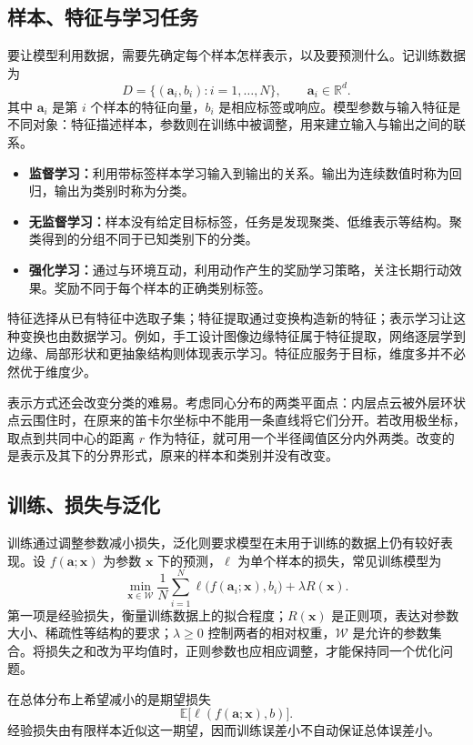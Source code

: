 \documentclass[UTF8,fontset=fandol,a4paper,12pt]{ctexart}
\newcommand{\R}{\mathbb R}
\newcommand{\E}{\mathbb E}
\newcommand{\vx}{\boldsymbol x}
\newcommand{\va}{\boldsymbol a}
\theoremstyle{definition}
\begin{document}
\subsection{样本、特征与学习任务}
要让模型利用数据，需要先确定每个样本怎样表示，以及要预测什么。记训练数据为
\[
 D=\{(\va_i,b_i):i=1,\ldots,N\},\qquad \va_i\in\R^d.
\]
其中 $\va_i$ 是第 $i$ 个样本的特征向量，$b_i$ 是相应标签或响应。模型参数与输入特征是不同对象：特征描述样本，参数则在训练中被调整，用来建立输入与输出之间的联系。
\begin{itemize}
\item \textbf{监督学习：}利用带标签样本学习输入到输出的关系。输出为连续数值时称为回归，输出为类别时称为分类。
\item \textbf{无监督学习：}样本没有给定目标标签，任务是发现聚类、低维表示等结构。聚类得到的分组不同于已知类别下的分类。
\item \textbf{强化学习：}通过与环境互动，利用动作产生的奖励学习策略，关注长期行动效果。奖励不同于每个样本的正确类别标签。
\end{itemize}

特征选择从已有特征中选取子集；特征提取通过变换构造新的特征；表示学习让这种变换也由数据学习。例如，手工设计图像边缘特征属于特征提取，网络逐层学到边缘、局部形状和更抽象结构则体现表示学习。特征应服务于目标，维度多并不必然优于维度少。

表示方式还会改变分类的难易。考虑同心分布的两类平面点：内层点云被外层环状点云围住时，在原来的笛卡尔坐标中不能用一条直线将它们分开。若改用极坐标，取点到共同中心的距离 $r$ 作为特征，就可用一个半径阈值区分内外两类。改变的是表示及其下的分界形式，原来的样本和类别并没有改变。

\subsection{训练、损失与泛化}
训练通过调整参数减小损失，泛化则要求模型在未用于训练的数据上仍有较好表现。设 $f(\va;\vx)$ 为参数 $\vx$ 下的预测，$\ell$ 为单个样本的损失，常见训练模型为
\begin{equation}\label{eq:learning}
 \boxed{\min_{\vx\in\mathcal W}\frac1N\sum_{i=1}^N
 \ell\bigl(f(\va_i;\vx),b_i\bigr)+\lambda R(\vx).}
\end{equation}
第一项是经验损失，衡量训练数据上的拟合程度；$R(\vx)$ 是正则项，表达对参数大小、稀疏性等结构的要求；$\lambda\ge0$ 控制两者的相对权重，$\mathcal W$ 是允许的参数集合。将损失之和改为平均值时，正则参数也应相应调整，才能保持同一个优化问题。

在总体分布上希望减小的是期望损失
\[
 \E\bigl[\ell(f(\va;\vx),b)\bigr].
\]
经验损失由有限样本近似这一期望，因而训练误差小不自动保证总体误差小。
\end{document}
